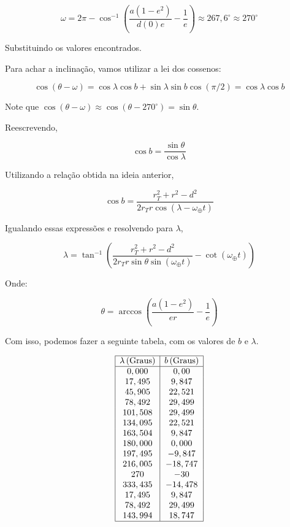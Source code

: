 \documentclass[11pt]{article}
\begin{document}
\begin{pproblem}
\begin{pssolution*}{}{}
\begin{alternativas}
            \[\omega = 2\pi-\cos^{-1}\left(\frac{a(1-e^2)}{d(0)e}-\frac{1}{e}\right) \approx 267,6^\circ \approx 270^\circ\]

            Substituindo os valores encontrados.

            Para achar a inclinação, vamos utilizar a lei dos cossenos:

            \[\cos(\theta-\omega)=\cos\lambda\cos b + \sin\lambda\sin b\cos(\pi/2) = \cos\lambda\cos b\]
            
            Note que \(\cos(\theta-\omega) \approx \cos(\theta-270^\circ) = \sin \theta\).

            Reescrevendo,

            \[\cos b = \frac{\sin\theta}{\cos\lambda}\]

            Utilizando a relação obtida na ideia anterior,

            \[\cos b  = \frac{r_T^2 + r^2 - d^2}{2 r_T r\cos (\lambda - \omega_\oplus t)}\]

            Igualando essas expressões e resolvendo para \(\lambda\),

            \[\lambda = \tan^{-1} \left( 
                \frac{r_T^2 + r^2 - d^2}{2 r_T r \sin \theta \sin (\omega_\oplus t)} - \cot (\omega_\oplus t)
                \right)\]

            Onde:

            \[
            \theta = \arccos \left( \frac{a (1 - e^2)}{e r} - \frac{1}{e} \right)
            \] 
            
            Com isso, podemos fazer a seguinte tabela, com os valores de \(b\) e \(\lambda\).

            \[
            \begin{array}{|c|c|}
            \hline
            \lambda \, (\text{Graus}) & b \, (\text{Graus}) \\ \hline
            0,000     & 0,00     \\ 
            17,495    & 9,847    \\ 
            45,905    & 22,521   \\ 
            78,492    & 29,499   \\ 
            101,508   & 29,499   \\ 
            134,095   & 22,521   \\ 
            163,504   & 9,847    \\ 
            180,000   & 0,000    \\ 
            197,495   & -9,847   \\ 
            216,005   & -18,747  \\ 
            270       & -30      \\ 
            333,435   & -14,478  \\ 
            17,495    & 9,847    \\ 
            78,492    & 29,499   \\ 
            143,994   & 18,747   \\ \hline
            \end{array}
            \]


\end{alternativas}
\end{pssolution*}
\end{pproblem}
\end{document}
